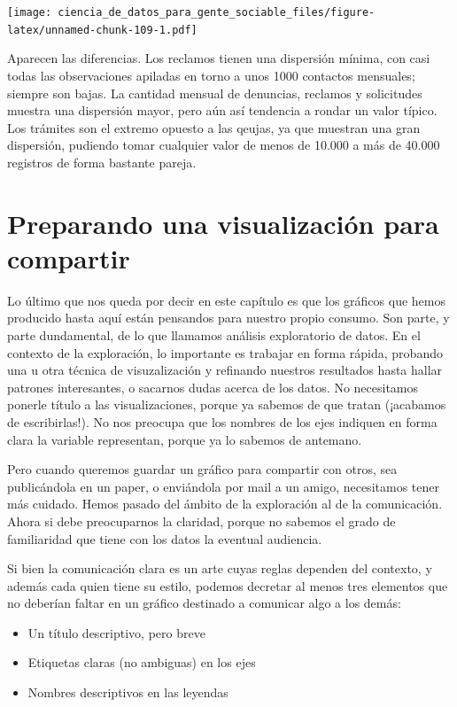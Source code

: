 \documentclass[spanish,]{book}
\providecommand{\tightlist}{%
  \setlength{\itemsep}{0pt}\setlength{\parskip}{0pt}}
\begin{document}
\texttt{[image: ciencia\_de\_datos\_para\_gente\_sociable\_files/figure-latex/unnamed-chunk-109-1.pdf]}

Aparecen las diferencias. Los reclamos tienen una dispersión mínima, con casi todas las observaciones apiladas en torno a unos 1000 contactos mensuales; siempre son bajas. La cantidad mensual de denuncias, reclamos y solicitudes muestra una dispersión mayor, pero aún así tendencia a rondar un valor típico. Los trámites son el extremo opuesto a las qeujas, ya que muestran una gran dispersión, pudiendo tomar cualquier valor de menos de 10.000 a más de 40.000 registros de forma bastante pareja.

\hypertarget{preparando-una-visualizaciuxf3n-para-compartir}{%
\section{Preparando una visualización para compartir}\label{preparando-una-visualizaciuxf3n-para-compartir}}

Lo último que nos queda por decir en este capítulo es que los gráficos que hemos producido hasta aquí están pensandos para nuestro propio consumo. Son parte, y parte dundamental, de lo que llamamos análisis exploratorio de datos. En el contexto de la exploración, lo importante es trabajar en forma rápida, probando una u otra técnica de visuzalización y refinando nuestros resultados hasta hallar patrones interesantes, o sacarnos dudas acerca de los datos. No necesitamos ponerle título a las visualizaciones, porque ya sabemos de que tratan (¡acabamos de escribirlas!). No nos preocupa que los nombres de los ejes indiquen en forma clara la variable representan, porque ya lo sabemos de antemano.

Pero cuando queremos guardar un gráfico para compartir con otros, sea publicándola en un paper, o enviándola por mail a un amigo, necesitamos tener más cuidado. Hemos pasado del ámbito de la exploración al de la comunicación. Ahora si debe preocuparnos la claridad, porque no sabemos el grado de familiaridad que tiene con los datos la eventual audiencia.

Si bien la comunicación clara es un arte cuyas reglas dependen del contexto, y además cada quien tiene su estilo, podemos decretar al menos tres elementos que no deberían faltar en un gráfico destinado a comunicar algo a los demás:

\begin{itemize}
\tightlist
\item
  Un título descriptivo, pero breve
\item
  Etiquetas claras (no ambiguas) en los ejes
\item
  Nombres descriptivos en las leyendas
\end{itemize}
\end{document}
